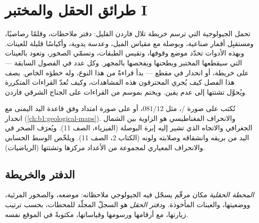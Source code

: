 \chapter{طرائق الحقل والمختبر I}\label{ch:b1:field-lab-methods-1}

تحمل الجيولوجية التي ترسم خريطة تلال فاردن القليل: دفتر ملاحظات، وقلمًا رصاصيًا، ومستقبِل أقمار صناعية، وبوصلة مع مقياس الميل، وعدسة يدوية، وأكياسًا قليلة للعينات. وبهذه الأدوات تحدّد موضع وقوفها، وتقيس  الطبقات، وتسمّي الصخور، وتعود بالعينات التي سيقطعها المختبر ويطحنها ويفحصها بالمجهر. وكل عدد في الفصول السابقة ---  على خريطة، أو انحدار في مقطع --- بدأ قراءةً من هذا النوع، وله خطؤه الخاص. يصف هذا الفصل كيف يُجري المحترفون هذه المشاهدات، وكيف تُعدّ القراءات المتكررة ويُحوَّل تشتتها إلى عدم يقين. ويختم بموسم من القراءات على الجناح الشرقي  فاردن.

\begin{recall}
تُكتب  على صورة /، مثل $081/12$، أو على صورة امتداد وفق قاعدة اليد اليمنى مع انحدار (\cref{ch:b1:geological-maps}). والانحراف المغناطيسي هو الزاوية بين الشمال الجغرافي والاتجاه الذي تشير إليه إبرة البوصلة (الفيزياء، الصف 11). ويُعرَف الصخر في اليد من بريقه وانشقاقه وصلابته ولونه (الكتاب 2، الصف 11). ويلخّص الوسط الحسابي والانحراف المعياري لمجموعة من الأعداد مركزها وتشتتها (الرياضيات).
\end{recall}

\section{الدفتر والخريطة}

\begin{definition}\label{def:b1:field-lab-methods-1:station}
\emph{المحطة الحقلية} مكان مرقّم يسجّل فيه الجيولوجي ملاحظاته: موضعه، والصخور المرئية، ووضعيتها، والعينات المأخوذة. و\emph{دفتر الحقل} هو السجلّ المجلّد للمحطات، بحسب ترتيب زيارتها، مع أرقامها ورسومها وقياساتها، مكتوبةً في الموقع نفسه.
\end{definition}

